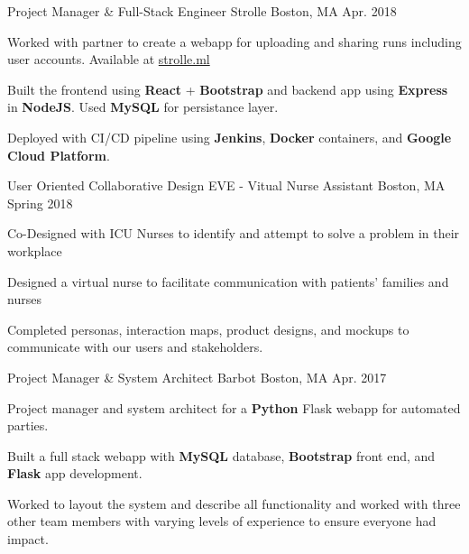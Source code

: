 

\begin{cventries}

  \cventry
    {Project Manager \& Full-Stack Engineer} %
    {Strolle} %
    {Boston, MA} %
    {Apr. 2018} %
    {
      \begin{cvitems} %
        \item Worked with partner to create a webapp for uploading and sharing runs including user accounts. Available at \href{https://strolle.ml/}{strolle.ml} 
        \item Built the frontend using \textbf{React} + \textbf{Bootstrap} and backend app using \textbf{Express} in \textbf{NodeJS}. Used \textbf{MySQL} for persistance layer.
        \item Deployed with CI/CD pipeline using \textbf{Jenkins}, \textbf{Docker} containers, and \textbf{Google Cloud Platform}.
      \end{cvitems}
    }


  \cventry
  {User Oriented Collaborative Design} %
  {EVE - Vitual Nurse Assistant} %
  {Boston, MA} %
  {Spring 2018} %
  {
    \begin{cvitems} %
      \item Co-Designed with ICU Nurses to identify and attempt to solve a problem in their workplace
      \item Designed a virtual nurse to facilitate communication with patients' families and nurses
      \item Completed personas, interaction maps, product designs, and mockups to communicate with our users and stakeholders.
    \end{cvitems}
  }

  \cventry
    {Project Manager \& System Architect} %
    {Barbot} %
    {Boston, MA} %
    {Apr. 2017} %
    {
      \begin{cvitems} %
        \item Project manager and system architect for a \textbf{Python} Flask webapp for automated parties. 
	      \item Built a full stack webapp with \textbf{MySQL} database, \textbf{Bootstrap} front end, and \textbf{Flask} app development. 
	      \item Worked to layout the system and describe all functionality and worked with three other team members with varying levels of experience to ensure everyone had impact. 
      \end{cvitems}
    }

\end{cventries}
